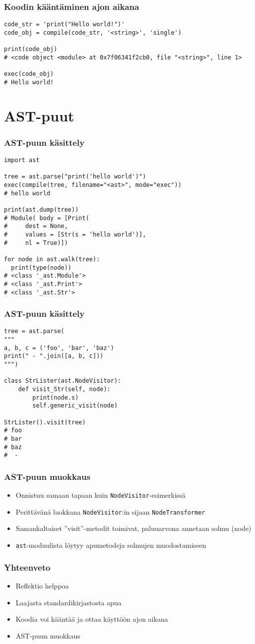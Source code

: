 \documentclass{beamer}
\begin{document}
\begin{frame}[fragile]
\frametitle{Koodin kääntäminen ajon aikana}
\begin{verbatim}
code_str = 'print("Hello world!")'
code_obj = compile(code_str, '<string>', 'single')

print(code_obj)
# <code object <module> at 0x7f06341f2cb0, file "<string>", line 1>

exec(code_obj)
# Hello world!
\end{verbatim}
\end{frame}


\section{AST-puut}


\begin{frame}[fragile]
\frametitle{AST-puun käsittely}
\begin{verbatim}
import ast

tree = ast.parse("print('hello world')")
exec(compile(tree, filename="<ast>", mode="exec"))
# hello world

print(ast.dump(tree))
# Module( body = [Print(
#     dest = None, 
#     values = [Str(s = 'hello world')], 
#     nl = True)])

for node in ast.walk(tree):
  print(type(node))
# <class '_ast.Module'>
# <class '_ast.Print'>
# <class '_ast.Str'>

\end{verbatim}
\end{frame}


\begin{frame}[fragile]
\frametitle{AST-puun käsittely}
\begin{verbatim}
tree = ast.parse(
"""
a, b, c = ('foo', 'bar', 'baz')
print(" - ".join([a, b, c]))
""")

class StrLister(ast.NodeVisitor):
    def visit_Str(self, node):
        print(node.s)
        self.generic_visit(node)

StrLister().visit(tree)
# foo
# bar
# baz
#  - 
\end{verbatim}
\end{frame}


\begin{frame}[fragile]
\frametitle{AST-puun muokkaus}
\begin{itemize}
\item{Onnistuu samaan tapaan kuin \verb|NodeVisitor|-esimerkissä}
\item{Perittävänä luokkana \verb|NodeVisitor|:in sijaan \verb|NodeTransformer|}
\item{Samankaltaiset ''visit''-metodit toimivat, paluuarvona annetaan solmu (node)}
\item{\verb|ast|-moduulista löytyy apumetodeja solmujen muodostamiseen}
\end{itemize}
\end{frame}


\begin{frame}[fragile]
  \frametitle{Yhteenveto}
\begin{itemize}
\item{Reflektio helppoa}
\item{Laajasta standardikirjastosta apua}
\item{Koodia voi kääntää ja ottaa käyttöön ajon aikana}
\item{AST-puun muokkaus}
\end{itemize}
\end{frame}
\end{document}
